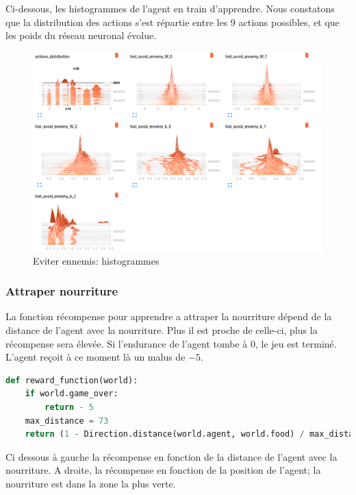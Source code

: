 \documentclass[11pt,a4paper]{report}
\begin{document}
  \par Ci-dessous, les histogrammes de l'agent en train d'apprendre. Nous constatons que la distribution des actions s'est répartie entre les 9 actions possibles, et que les poids du réseau neuronal évolue. 
  
   \begin{figure}[!h]
   \center
   \includegraphics[scale=0.4]{ressources/reward_function_histograms_avoid_ennemies.png}
   \caption{Eviter ennemis: histogrammes}
   \end{figure} 

 \subsubsection{Attraper nourriture}
 
   \par La fonction récompense pour apprendre a attraper la nourriture dépend de la distance de l'agent avec la nourriture. Plus il est proche de celle-ci, plus la récompense sera élevée. Si l'endurance de l'agent tombe à 0, le jeu est terminé. L'agent reçoit à ce moment là un malus de $-5$. 
   
  \begin{lstlisting}[language=python]
def reward_function(world):
    if world.game_over:
        return - 5
    max_distance = 73
    return (1 - Direction.distance(world.agent, world.food) / max_distance) 
   \end{lstlisting}  
   
  
  \par Ci dessous à gauche la récompense en fonction de la distance de l'agent avec la nourriture. A droite, la récompense en fonction de la position de l'agent; la nourriture est dans la zone la plus verte. 
  
\end{document}
